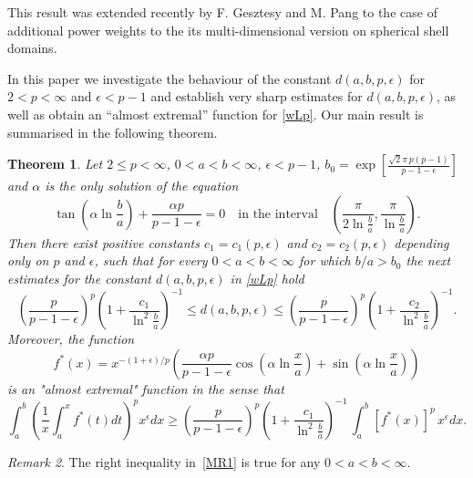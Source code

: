 \documentclass{amsart}
\newtheorem{theorem}{Theorem}[section]
\theoremstyle{definition}
\theoremstyle{remark}
\newtheorem{remark}[theorem]{Remark}
\numberwithin{equation}{section}
\begin{document}
This result was extended recently by F. Gesztesy and M. Pang \cite{GP} to the case of
additional power weights to the its multi-dimensional version on spherical shell domains.




 In this paper we investigate the behaviour of the constant $d(a,b,p,\epsilon)$  for $2< p<\infty$ and $\epsilon< p-1$ and  establish very sharp estimates for $d(a,b,p,\epsilon)$, as well as obtain an ``almost extremal'' function for \eqref{wLp}. Our main result is summarised in the following theorem.  

\begin{theorem}\label{th1}
Let $2\le p<\infty$, $0<a<b<\infty$,  $\epsilon< p-1$,  %
$b_0=\exp\left[\frac{\sqrt2 \pi\,p(p-1)}{p-1-\epsilon} \right]$
and $\alpha$ is the only solution of the equation
\[
\tan\left(\alpha\ln \frac{b}{a} \right)+\frac{\alpha p}{p-1-\epsilon}=0\quad\mbox{in the interval}\quad
\left(\frac{\pi}{2\ln \frac{b}{a}},\frac{\pi}{\ln \frac{b}{a}} \right).
\]
 Then there exist positive constants $c_1=c_1(p,\epsilon)$ and  $c_2=c_2(p,\epsilon)$ 
depending only on $p$ and $\epsilon$, %
  such that  for every $0<a<b<\infty$ for which $b/a>b_0$ the next estimates
for the constant $d(a,b,p,\epsilon)$ in \eqref{wLp} hold 
\begin{equation}\label{MR1}
\left(\frac{p}{p-1-\epsilon} \right)^p  \left(1+\frac{c_1}{\ln^2 \frac{b}{a}}\right)^{-1}\!\!
\le d(a,b,p,\epsilon)
\le \left(\frac{p}{p-1-\epsilon} \right)^p  \left(1+\frac{c_2}{\ln^2 \frac{b}{a}}\right)^{-1}\!\!.
\end{equation}
Moreover, the function 
\begin{equation}\label{fun}
f^\ast(x)=x^{-(1+\epsilon)/p}\left(\frac{\alpha p}{p-1-\epsilon} \cos\left(\alpha\ln \frac{x}{a}\right)+\sin\left(\alpha\ln  \frac{x}{a}\right)\right)
\end{equation}
is an "almost extremal" function in the sense that 
\begin{equation*}
\int_a^b\left(\frac{1}{x}\int_a^x f^\ast(t)dt\right)^px^{\epsilon}dx
\geq \left(\frac{p}{p-1-\epsilon} \right)^p  \left(1+\frac{c_1}{\ln^2 \frac{b}{a}}\right)^{-1}\,\int_a^b [f^\ast(x)]^p \,x^{\epsilon}dx.
\end{equation*}
\end{theorem}
\begin{remark}
The right inequality in~\eqref{MR1} is true for any $0<a<b<\infty$.
\end{remark}
\end{document}
